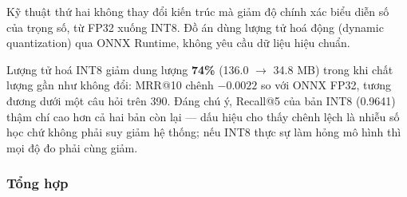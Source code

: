 \documentclass[../DoAn.tex]{subfiles}
\begin{document}
Kỹ thuật thứ hai không thay đổi kiến trúc mà giảm độ chính xác biểu diễn số của trọng số, từ FP32 xuống INT8. Đồ án dùng lượng tử hoá động (dynamic quantization) qua ONNX Runtime, không yêu cầu dữ liệu hiệu chuẩn.

\begin{table}[H]
    \centering
    \caption{Lượng tử hoá INT8 trên pruned 35.6M}
    \label{tab:int8-quality}
    {\small
    \setlength{\tabcolsep}{4pt}
    }
\end{table}

Lượng tử hoá INT8 giảm dung lượng \textbf{74\%} (136.0 $\to$ 34.8 MB) trong khi chất lượng gần như không đổi: MRR@10 chênh $-0.0022$ so với ONNX FP32, tương đương dưới một câu hỏi trên 390. Đáng chú ý, Recall@5 của bản INT8 (0.9641) thậm chí cao hơn cả hai bản còn lại --- dấu hiệu cho thấy chênh lệch là nhiễu số học chứ không phải suy giảm hệ thống; nếu INT8 thực sự làm hỏng mô hình thì mọi độ đo phải cùng giảm.

\subsubsection{Tổng hợp}
\end{document}
